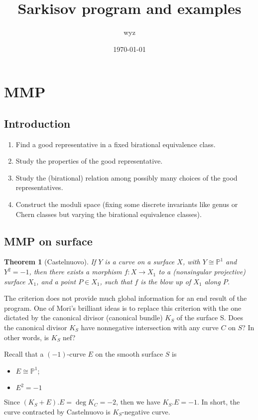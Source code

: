 \documentclass{article}
\title{Sarkisov program and examples}
\author{wyz}
\date{\today}
\newtheorem{thm}[defn]{Theorem}
\begin{document}
\maketitle

\section{MMP}

\subsection{Introduction}
\begin{enumerate}
	\item Find a good representative in a fixed birational equivalence class.
	\item Study the properties of the good representative.
	\item Study the (birational) relation among possibly many choices of the good representatives.
	\item Construct the moduli space (fixing some discrete invariants like genus or Chern classes but varying the birational equivalence classes).
\end{enumerate}

\subsection{MMP on surface}
\begin{thm}[Castelnuovo]
	If $Y$  is a curve on a surface $X$, with $Y \cong \mathbb{P}^{1}$ and $Y^2 = -1$, then there exists a morphism $f: X \to X_{1}$ to a (nonsingular projective) surface $X_{1}$, and a point $P\in X_{1}$, such that $f$ is the blow up of $X_{1}$ along  $P$.
\end{thm}

The criterion does not provide much global information for an end result of the program.  One of Mori's brilliant ideas is to replace this criterion with the one dictated by the canonical divisor (canonical bundle) $K_{S}$ of the surface S. Does the canonical divisor $K_{S}$  have nonnegative intersection with any curve $C$ on $S$? In other words, is $K_{S}$ nef?

Recall that a $(-1)$-curve $E$ on the smooth surface  $S$  is
\begin{itemize}
	\item $E\cong \mathbb{P}^{1}$;
	\item $E^{2}=-1$
\end{itemize}
Since $(K_{S}+E).E=\deg K_{C}=-2$, then we have $K_{S}.E=-1$. In short, the curve contracted by Castelnuovo is $K_{S}$-negative curve.
\end{document}
